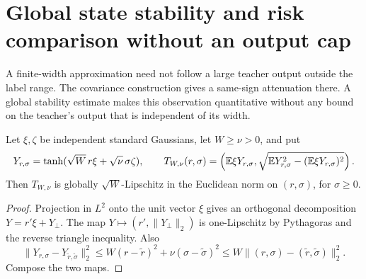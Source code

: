 \section{Global state stability and risk comparison without an output cap}
\label{sec:global-response-risk}
A finite-width approximation need not follow a large teacher output outside the label range. The covariance construction gives a same-sign attenuation there. A global stability estimate makes this observation quantitative without any bound on the teacher's output that is independent of its width.

\begin{lemma}
\label{lem:moment-projection}
Let $\xi,\zeta$ be independent standard Gaussians, let $W\ge\nu>0$, and put
\[
 Y_{r,\sigma}=\tanh(\sqrt W\,r\xi+\sqrt\nu\,\sigma\zeta),
 \qquad
 T_{W,\nu}(r,\sigma)=
 \left(\mathbb E\xi Y_{r,\sigma},
   \sqrt{\mathbb E Y_{r,\sigma}^2-(\mathbb E\xi Y_{r,\sigma})^2}\right).
\]
Then $T_{W,\nu}$ is globally $\sqrt W$-Lipschitz in the Euclidean norm on $(r,\sigma)$, for $\sigma\ge0$.
\end{lemma}
\begin{proof}
Projection in $L^2$ onto the unit vector $\xi$ gives an orthogonal decomposition $Y=r'\xi+Y_\perp$. The map
$Y\mapsto(r',\|Y_\perp\|_2)$ is one-Lipschitz by Pythagoras and the reverse triangle inequality. Also
\[
 \|Y_{r,\sigma}-Y_{\widetilde r,\widetilde\sigma}\|_2^2
 \le W(r-\widetilde r)^2+\nu(\sigma-\widetilde\sigma)^2
 \le W\|(r,\sigma)-(\widetilde r,\widetilde\sigma)\|_2^2.
\]
Compose the two maps.
\end{proof}

